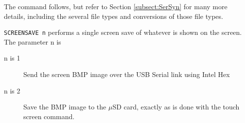  The command follows, but refer to Section \ref{subsect:SerSyn} for many more details, including the several file types and conversions of those file types.

\texttt{SCREENSAVE n} performs a single screen save of whatever is shown on the screen.  The parameter n is
\begin{description}
\item[n is 1] Send the screen BMP image over the USB Serial link using Intel Hex
\item[n is 2] Save the BMP image to the $\mu$SD card, exactly as is done with the touch screen command.
\end{description}

